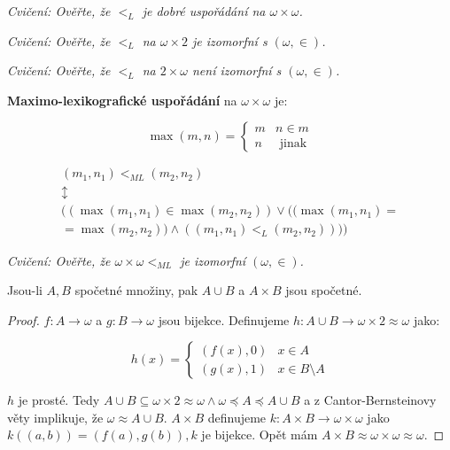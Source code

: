 \textit{Cvičení: Ověřte, že $<_{L}$ je dobré uspořádání na $\omega \times \omega$.}

\textit{Cvičení: Ověřte, že $<_{L}$ na $\omega \times 2$ je izomorfní s $(\omega, \in)$.}

\textit{Cvičení: Ověřte, že $<_{L}$ na $2 \times \omega$ není izomorfní s $(\omega, \in)$.}

\begin{definice}
	\textbf{Maximo-lexikografické uspořádání} na $\omega \times \omega$ je:
	
	$$
	\max(m,n) =
	\left\{
	\begin{array}{ll}
		m & n \in m \\
		n & \text{ jinak}
	\end{array}
	\right.
	$$
	
	$$
	\begin{array}{c}
		(m_{1},n_{1}) <_{ML} (m_{2},n_{2}) \\
		\updownarrow \\
		((\max(m_{1},n_{1}) \in \max(m_{2},n_{2})) \lor ((\max(m_{1},n_{1}) = \\
		= \max(m_{2},n_{2})) \land ((m_{1},n_{1}) <_{L} (m_{2},n_{2}))))
	\end{array}
	$$
\end{definice}

\textit{Cvičení: Ověřte, že $\omega \times \omega <_{ML}$ je izomorfní $(\omega, \in)$.}

\begin{thm}
	Jsou-li $A,B$ spočetné množiny, pak $A \cup B$ a $A \times B$ jsou spočetné.
\end{thm}

\begin{proof}
	$f: A \to \omega$ a $g: B \to \omega$ jsou bijekce. Definujeme $h: A \cup B \to \omega \times 2 \approx \omega$ jako:
	
	$$
	h(x) =
	\left\{
	\begin{array}{ll}
		(f(x),0) & x \in A \\
		(g(x),1) & x \in B \setminus A
	\end{array}
	\right.
	$$
	
	$h$ je prosté. Tedy $A \cup B \subseteq \omega \times 2 \approx \omega \land \omega \preceq A \preceq A \cup B$ a z Cantor-Bernsteinovy věty implikuje, že $\omega \approx A \cup B$. $A \times B$ definujeme $k: A \times B \to \omega \times \omega$ jako $k((a,b)) = (f(a),g(b)), k$ je bijekce. Opět mám $A \times B \approx \omega \times \omega \approx \omega$.
\end{proof}

